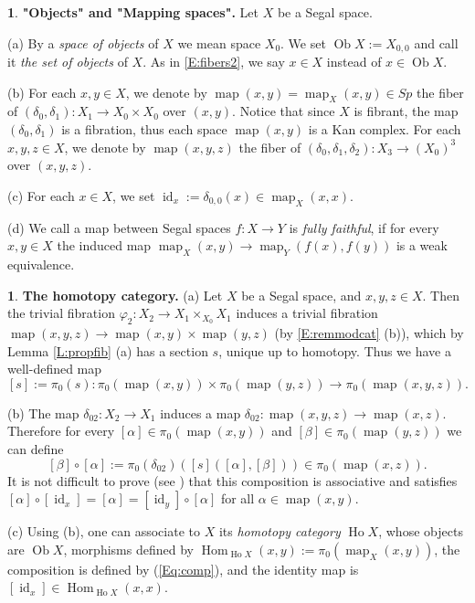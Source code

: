 \documentclass[12pt]{amsart}
\theoremstyle{plain}
\theoremstyle{definition}
\newtheorem{Emp}[Thm]{}
\numberwithin{equation}{section}
\newcommand{\form}[1]{(\ref{Eq:#1})}
\newcommand{\dt}{\delta}
\newcommand{\al}{\alpha}
\newcommand{\rl}[1]{Lemma \ref{L:#1}}
\newcommand{\re}[1]{\ref{E:#1}}
\newcommand{\id}{\operatorname{id}}
\newcommand{\map}{\operatorname{map}}
\newcommand{\Ho}{\operatorname{Ho}}
\newcommand{\Ob}{\operatorname{Ob}}
\newcommand{\Hom}{\operatorname{Hom}}
\begin{document}
\begin{Emp} \label{E:objmap}
{\bf "Objects" and "Mapping spaces".} Let $X$ be a Segal space.

(a) By a {\em space of objects} of $X$ we mean space $X_0$. We set
$\Ob X:=X_{0,0}$ and call it {\em the set of objects} of $X$. As
in \re{fibers2}, we say $x\in X$ instead of $x\in\Ob X$.

(b) For each $x,y\in X$, we denote by $\map(x,y)=\map_X(x,y)\in
Sp$ the fiber of $(\dt_0,\dt_1):X_1\to X_0\times X_0$ over
$(x,y)$. Notice that since $X$ is fibrant, the map $(\dt_0,\dt_1)$
is a fibration, thus each space $\map(x,y)$ is a Kan complex. For each
$x,y,z\in X$,  we denote by $\map(x,y,z)$  the fiber of
$(\dt_0,\dt_1,\dt_2):X_3\to(X_0)^3$ over $(x,y,z)$.

(c) For each $x\in X$, we set $\id_x:=\dt_{0,0}(x)\in\map_X(x,x)$.

(d) We call a map between Segal spaces  $f:X\to Y$ is {\em fully
faithful}, if for every $x,y\in X$ the induced map
$\map_X(x,y)\to\map_Y(f(x),f(y))$ is a weak equivalence. 
\end{Emp}

\begin{Emp} \label{E:ho}
{\bf The homotopy category.} (a) Let $X$ be a Segal space, and
$x,y,z\in X$. Then the trivial fibration $\varphi_2:X_2\to
X_1\times_{X_0}X_1$ induces a trivial fibration
$\map(x,y,z)\to\map(x,y)\times\map(y,z)$ (by \re{remmodcat} (b)),
which by \rl{propfib} (a) has a section $s$, unique up to
homotopy. Thus we have a well-defined map
\[
[s]:=\pi_0(s):\pi_0(\map(x,y))\times\pi_0(\map(y,z))\to\pi_0(\map(x,y,z)).
\]

(b) The map $\dt_{02}:X_2\to X_1$ induces a map
$\dt_{02}:\map(x,y,z)\to \map(x,z)$. Therefore for every
$[\al]\in\pi_0(\map(x,y))$ and $[\beta]\in\pi_0(\map(y,z))$ we can
define %
%
\begin{equation} \label{Eq:comp}
[\beta]\circ[\al]:=\pi_0(\dt_{02})(
[s]([\al],[\beta]))\in\pi_0(\map(x,z)).
\end{equation}
%
It is not difficult to prove (see \cite[Prop. 5.4]{Re}) that this
composition is associative and satisfies 
$[\al]\circ[\id_x]=[\al]=[\id_y]\circ [\al]$ for all
$\al\in\map(x,y)$.

(c) Using (b), one can associate to $X$ its {\em homotopy
category} $\Ho X$, whose objects are $\Ob X$, morphisms defined by
$\Hom_{\Ho X}(x,y):=\pi_0(\map_X(x,y))$, the composition is
defined by \form{comp}, and the identity map is
$[\id_x]\in\Hom_{\Ho X}(x,x)$.
\end{Emp}
\end{document}
